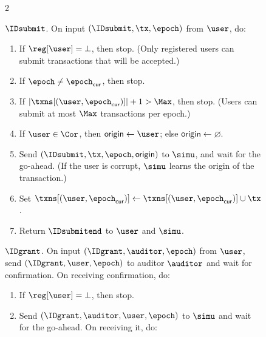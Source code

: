 \begin{figure}
\begin{minipage}{1.1\textwidth}
\begin{framed}
\begin{multicols}{2}
\begin{enumerate}
        \end{enumerate}

        {$\IDsubmit$.} On input $(\IDsubmit, \tx, \epoch)$ from $\user$, do:

        \begin{enumerate}

          \item If $\reg[\user] = \bot$, then stop. (Only registered users can
            submit transactions that will be accepted.)

          \item If $\epoch \neq \epoch_{\mathsf{cur}}$, then stop.

          \item If $|\txns[(\user,\epoch_{\mathsf{cur}})]| + 1 > \Max$, then
            stop. (Users can submit at most $\Max$ transactions per epoch.)

          \item If $\user \in \Cor$, then $\mathsf{origin} \leftarrow \user$;
            else $\mathsf{origin} \leftarrow \varnothing$.

          \item Send $(\IDsubmit, \tx, \epoch, \mathsf{origin})$ to $\simu$,
            and wait for the go-ahead. (If the user is corrupt, $\simu$ learns
            the origin of the transaction.)

          \item Set $\txns[(\user,\epoch_{\mathsf{cur}})] \leftarrow
            \txns[(\user,\epoch_{\mathsf{cur}})] \cup \tx$.

          \item Return $\IDsubmitend$ to $\user$ and $\simu$.

        \end{enumerate}

        {$\IDgrant$.} On input $(\IDgrant, \auditor, \epoch)$ from $\user$,
        send $(\IDgrant, \user, \epoch)$ to auditor $\auditor$ and wait for
        confirmation. On receiving confirmation, do:

        \begin{enumerate}

          \item If $\reg[\user] = \bot$, then stop.

          \item Send $(\IDgrant, \auditor, \user, \epoch)$ to $\simu$ and wait
            for the go-ahead. On receiving it, do:

            \begin{enumerate}


\end{enumerate}
\end{enumerate}
\end{multicols}
\end{framed}
\end{minipage}
\end{figure}
